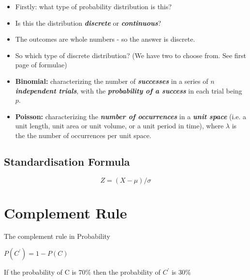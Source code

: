 \documentclass[12pt]{report}
\begin{document}
{\LARGE
	\begin{itemize}
		\item Firstly: what type of probability distribution is this?
		
		\item Is this the distribution \textbf{\emph{discrete}} or  \textbf{\emph{continuous}}?
		
		\item The outcomes are whole numbers - so the answer is discrete.
		
		\item So which type of discrete distribution? (We have two to choose from. See first page of formulae)
		
		
		\item \textbf{Binomial:} characterizing the number of \textbf{\emph{successes}} in a series of \textbf{\emph{$n$ independent trials}}, with the \textbf{\emph{probability of a success}} in each trial being $p$.
		
		\item \textbf{Poisson:}  characterizing the \textbf{\emph{number of occurrences}} in a \textbf{\emph{unit space}} (i.e. a unit length, unit area or unit volume, or a unit period in time), where $\lambda$ is the the number of occurrences per unit space.
		
	\end{itemize}
}


\subsection{Standardisation Formula}

\begin{equation}
Z = ( X - \mu ) / \sigma
\end{equation}


		\section*{Complement Rule}
		
		
		
		The complement rule in Probability
		
		$P(C^{\prime}) = 1- P(C)$
		
		
		
		If the probability of C is $70 \%$ then the probability of $C^{\prime}$ is $30\%$
		
\end{document}
